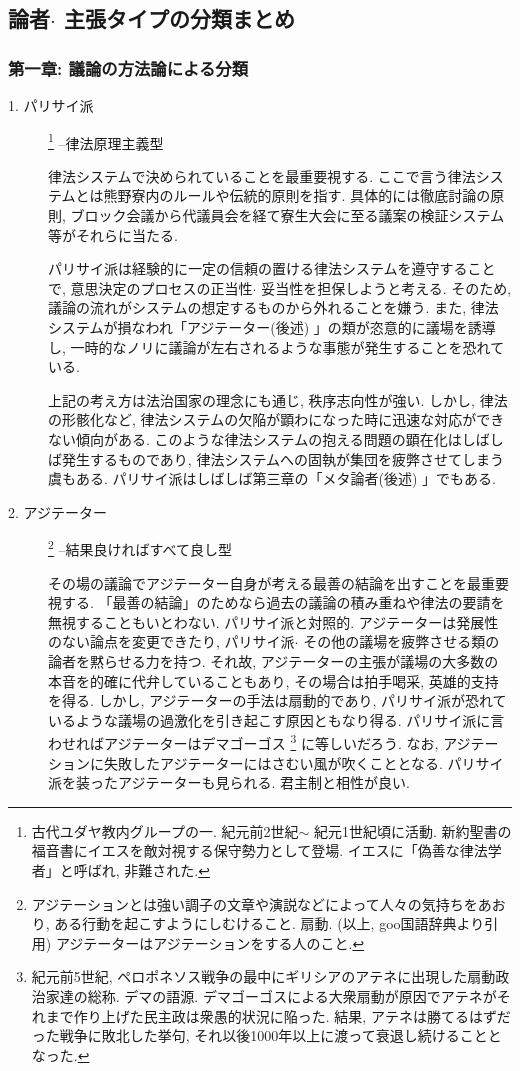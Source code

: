 \documentclass[10pt,b5jsbook,dvips,dvipdfmx,openany]{jsbook}
\theoremstyle{definition}
\begin{document}
		\subsection{論者$ \cdot $ 主張タイプの分類まとめ}

			\subsubsection{第一章: 議論の方法論による分類}
			\begin{description}
			\item[1. パリサイ派] \footnote{古代ユダヤ教内グループの一. 紀元前2世紀$ \sim $ 紀元1世紀頃に活動. 新約聖書の福音書にイエスを敵対視する保守勢力として登場. イエスに「偽善な律法学者」と呼ばれ, 非難された.} --律法原理主義型 

			律法システムで決められていることを最重要視する. ここで言う律法システムとは熊野寮内のルールや伝統的原則を指す. 具体的には徹底討論の原則, ブロック会議から代議員会を経て寮生大会に至る議案の検証システム等がそれらに当たる. 

			パリサイ派は経験的に一定の信頼の置ける律法システムを遵守することで, 意思決定のプロセスの正当性$ \cdot $ 妥当性を担保しようと考える. そのため, 議論の流れがシステムの想定するものから外れることを嫌う. また, 律法システムが損なわれ「アジテーター(後述) 」の類が恣意的に議場を誘導し, 一時的なノリに議論が左右されるような事態が発生することを恐れている. 

			上記の考え方は法治国家の理念にも通じ, 秩序志向性が強い. しかし, 律法の形骸化など, 律法システムの欠陥が顕わになった時に迅速な対応ができない傾向がある. このような律法システムの抱える問題の顕在化はしばしば発生するものであり, 律法システムへの固執が集団を疲弊させてしまう虞もある. パリサイ派はしばしば第三章の「メタ論者(後述) 」でもある. 

			\item[2. アジテーター] \footnote{アジテーションとは強い調子の文章や演説などによって人々の気持ちをあおり, ある行動を起こすようにしむけること.  扇動. (以上, goo国語辞典より引用) アジテーターはアジテーションをする人のこと. } --結果良ければすべて良し型

			その場の議論でアジテーター自身が考える最善の結論を出すことを最重要視する. 「最善の結論」のためなら過去の議論の積み重ねや律法の要請を無視することもいとわない. パリサイ派と対照的. アジテーターは発展性のない論点を変更できたり, パリサイ派$ \cdot $ その他の議場を疲弊させる類の論者を黙らせる力を持つ. それ故, アジテーターの主張が議場の大多数の本音を的確に代弁していることもあり, その場合は拍手喝采, 英雄的支持を得る. しかし, アジテーターの手法は扇動的であり, パリサイ派が恐れているような議場の過激化を引き起こす原因ともなり得る. パリサイ派に言わせればアジテーターはデマゴーゴス \footnote{紀元前5世紀, ペロポネソス戦争の最中にギリシアのアテネに出現した扇動政治家達の総称. デマの語源. デマゴーゴスによる大衆扇動が原因でアテネがそれまで作り上げた民主政は衆愚的状況に陥った. 結果, アテネは勝てるはずだった戦争に敗北した挙句, それ以後1000年以上に渡って衰退し続けることとなった. } に等しいだろう. なお, アジテーションに失敗したアジテーターにはさむい風が吹くこととなる. 
パリサイ派を装ったアジテーターも見られる. 君主制と相性が良い. 


\end{description}
\end{document}

